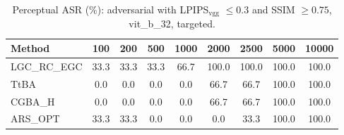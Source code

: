 \begin{table}[t]
\centering\footnotesize
\caption{Perceptual ASR (\%): adversarial with LPIPS$_{\mathrm{vgg}}$ $\le 0.3$ and SSIM $\ge 0.75$, vit\_b\_32, targeted.}
\begin{tabular}{lcccccccc}
\toprule
Method & 100 & 200 & 500 & 1000 & 2000 & 2500 & 5000 & 10000 \\
\midrule
LGC\_RC\_EGC & 33.3 & 33.3 & 33.3 & 66.7 & 100.0 & 100.0 & 100.0 & 100.0 \\
TtBA & 0.0 & 0.0 & 0.0 & 0.0 & 66.7 & 66.7 & 100.0 & 100.0 \\
CGBA\_H & 0.0 & 0.0 & 0.0 & 0.0 & 66.7 & 66.7 & 100.0 & 100.0 \\
ARS\_OPT & 33.3 & 33.3 & 0.0 & 0.0 & 0.0 & 33.3 & 100.0 & 100.0 \\
\bottomrule
\end{tabular}
\end{table}
